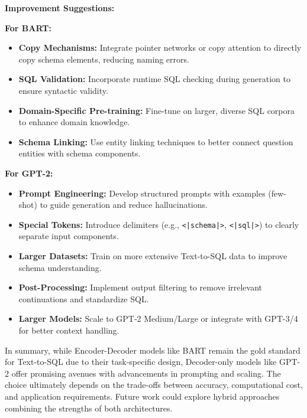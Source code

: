 \textbf{Improvement Suggestions:}

\textbf{For BART:}
\begin{itemize}
    \item \textbf{Copy Mechanisms:} Integrate pointer networks or copy attention to directly copy schema elements, reducing naming errors.
    \item \textbf{SQL Validation:} Incorporate runtime SQL checking during generation to ensure syntactic validity.
    \item \textbf{Domain-Specific Pre-training:} Fine-tune on larger, diverse SQL corpora to enhance domain knowledge.
    \item \textbf{Schema Linking:} Use entity linking techniques to better connect question entities with schema components.
\end{itemize}

\textbf{For GPT-2:}
\begin{itemize}
    \item \textbf{Prompt Engineering:} Develop structured prompts with examples (few-shot) to guide generation and reduce hallucinations.
    \item \textbf{Special Tokens:} Introduce delimiters (e.g., \texttt{\textless|schema|\textgreater}, \texttt{\textless|sql|\textgreater}) to clearly separate input components.
    \item \textbf{Larger Datasets:} Train on more extensive Text-to-SQL data to improve schema understanding.
    \item \textbf{Post-Processing:} Implement output filtering to remove irrelevant continuations and standardize SQL.
    \item \textbf{Larger Models:} Scale to GPT-2 Medium/Large or integrate with GPT-3/4 for better context handling.
\end{itemize}

In summary, while Encoder-Decoder models like BART remain the gold standard for Text-to-SQL due to their task-specific design, Decoder-only models like GPT-2 offer promising avenues with advancements in prompting and scaling. The choice ultimately depends on the trade-offs between accuracy, computational cost, and application requirements. Future work could explore hybrid approaches combining the strengths of both architectures.
